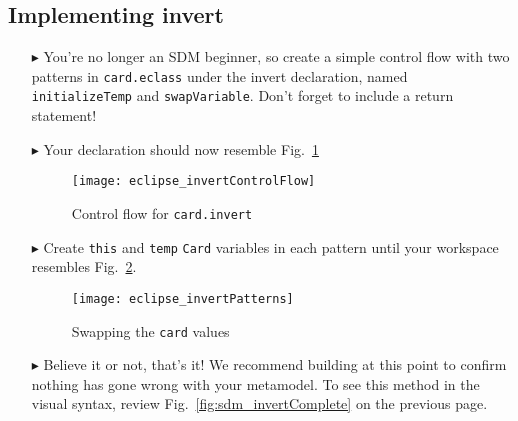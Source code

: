 \newpage
\hypertarget{invertCard tex}{}
\subsection{Implementing invert}
\texHeader

\begin{itemize}

\item[$\blacktriangleright$] You're no longer an SDM beginner, so create a simple control flow with two patterns in \texttt{card.eclass} under the invert
declaration, named \texttt{initializeTemp} and \texttt{swapVariable}. Don't forget to include a return statement!

\item[$\blacktriangleright$] Your declaration should now resemble Fig.~\ref{fig:eclipse_invert}

\begin{figure}[htbp]
\begin{center}
  \texttt{[image: eclipse\_invertControlFlow]}
  \caption{Control flow for \texttt{card.invert}}  
  \label{fig:eclipse_invert}
\end{center}
\end{figure}

\item[$\blacktriangleright$] Create \texttt{this} and \texttt{temp} \texttt{Card} variables in each pattern until your workspace resembles
Fig.~\ref{fig:invertPatterns}.

\begin{figure}[htbp]
\begin{center}
  \texttt{[image: eclipse\_invertPatterns]}
  \caption{Swapping the \texttt{card} values}  
  \label{fig:invertPatterns}
\end{center}
\end{figure}

\item[$\blacktriangleright$] Believe it or not, that's it! We recommend building at this point to confirm nothing has gone wrong with your metamodel. To
see this method in the visual syntax, review Fig.~\ref{fig:sdm_invertComplete} on the previous page.

\end{itemize}
